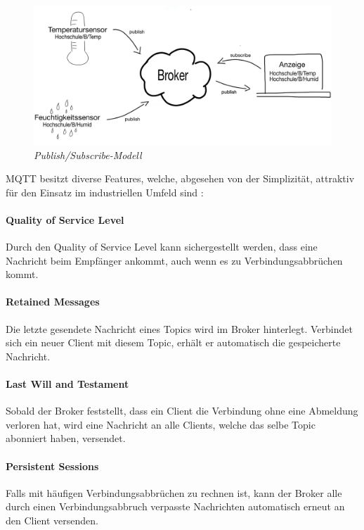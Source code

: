 \begin{figure}[h]
    \vspace{-\baselineskip}
        \centering
        \includegraphics[scale=0.5]{Pictures/brokerclient.png}
        \caption{\textit{Publish/Subscribe-Modell}}
        \label{img:MQTT}
\end{figure}

\smallskip

MQTT besitzt diverse Features, welche, abgesehen von der Simplizität, attraktiv für den Einsatz im industriellen Umfeld sind \citep{MQTT_Article}:

\paragraph{Quality of Service Level}
Durch den Quality of Service Level kann sichergestellt werden, dass eine Nachricht beim Empfänger ankommt, auch wenn es zu Verbindungsabbrüchen kommt.
\paragraph{Retained Messages}
Die letzte gesendete Nachricht eines Topics wird im Broker hinterlegt. Verbindet sich ein neuer Client mit diesem Topic, erhält er automatisch
die gespeicherte Nachricht.
\paragraph{Last Will and Testament}
Sobald der Broker feststellt, dass ein Client die Verbindung ohne eine Abmeldung verloren hat, wird eine Nachricht an alle Clients, welche das
selbe Topic abonniert haben, versendet.
\paragraph{Persistent Sessions}
Falls mit häufigen Verbindungsabbrüchen zu rechnen ist, kann der Broker alle durch einen Verbindungsabbruch verpasste Nachrichten automatisch 
erneut an den Client versenden.


